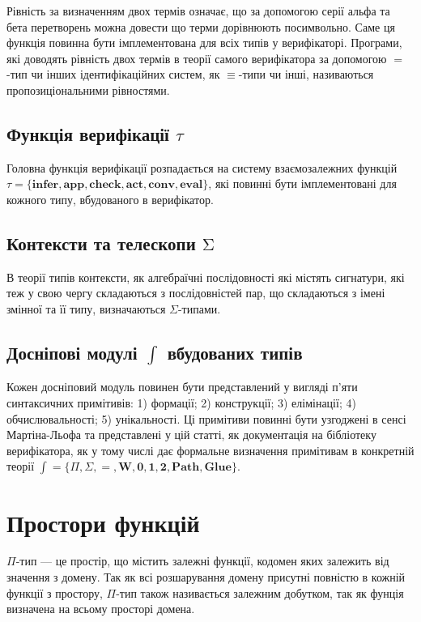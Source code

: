 \documentclass{article}
\theoremstyle{definition}
\begin{document}
Рівність за визначенням двох термів означає, що за допомогою серії альфа та бета
перетворень можна довести що терми дорівнюють посимвольно. Саме ця функція повинна бути
імплементована для всіх типів у верифікаторі. Програми, які доводять рівність двох термів
в теорії самого верифікатора за допомогою $=$-тип чи інших ідентифікаційних систем, як $\equiv$-типи чи інші,
називаються пропозиціональними рівностями.

\subsection*{Функція верифікації $\tau$}

Головна функція верифікації  розпадається на систему взаємозалежних функцій
$\tau = \{ \mathbf{infer},\mathbf{app}, \mathbf{check}, \mathbf{act}, \mathbf{conv}, \mathbf{eval} \}$,
які повинні бути імплементовані для кожного типу, вбудованого в верифікатор.

\subsection*{Контексти та телескопи $\mathrm{\Sigma}$}

В теорії типів контексти, як алгебраїчні послідовності які містять сигнатури, які теж у свою
чергу складаються з послідовністей пар, що складаються з імені змінної та її типу, визначаються
$\Sigma$-типами.

\subsection*{Досніпові модулі $\mathrm{\int}$ вбудованих типів}

Кожен досніповий модуль повинен бути представлений у вигляді п'яти
синтаксичних примітивів: 1) формації; 2) конструкції; 3) елімінації;
4) обчислювальності; 5) унікальності. Ці примітиви повинні бути узгоджені
в сенсі Мартіна-Льофа та представлені у цій статті,
як документація на бібліотеку верифікатора, як у тому числі дає формальне визначення
примітивам в конкретній теорії
$\mathrm{\int} = \{ \Pi, \Sigma, =, \mathbf{W}, \mathbf{0}, \mathbf{1}, \mathbf{2}, \mathbf{Path}, \mathbf{Glue} \}$.

\newpage

\section{Простори функцій}
$\Pi$-тип — це простір, що містить залежні функції, кодомен яких залежить від значення
з домену. Так як всі розшарування домену присутні повністю в кожній функції з простору,
$\Pi$-тип також називається залежним добутком, так як фунція визначена на всьому просторі домена.
\end{document}

